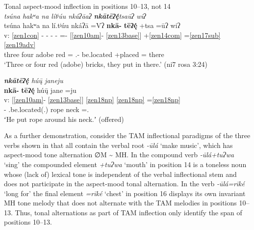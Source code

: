 \documentclass[output=paper]{langscibook}
\begin{document}
\ea\label{bkm:Ref83134430}Tonal aspect-mood inflection in positions 10{}--13, not 14 \\
            \ea \label{ex:key:27a} {
            {} \textit{tsúna hakʷa na lítʲúu nkáʔāaʔ \textbf{nkātēʔę́}tsaūʔ wiʔ} \\
            \glll {} tsúna hakʷa na lí.tʲúu nkáʔā =Vʔ \textbf{nkā-} \textbf{tēʔę́ } +tsa =ūʔ wiʔ \\
            v: \ref{zen1con} - - - - =- [\ref{zen10am}{}- \ref{zen13base}] +\ref{zen14com} =\ref{zen17sub} \ref{zen19adv} \\
             {} three four \Def{} adobe red =\Ana{} \Pfv.\Caus{}- be.located +placed =\Third\Pl{} there\\
            \glt `Three or four red (adobe) bricks, they put in there.' (ni7 rosa 3:24)
            }

            \ex \label{ex:key:27b}{ 
            \textit{\textbf{nkātēʔ\'{ę}} hú\={\k{u}} janeju} \\ 
            \glll {} \textbf{nkā-} \textbf{tēʔ\'{ę}} hú\={\k{u}} jane =ju\\
            v: [\ref{zen10am}{}- \ref{zen13base}] \ref{zen18np} \ref{zen18np} =\ref{zen18np} \\
            {} \Pfv{}- \Caus{}.be.located(.\Third{}) rope neck =\Third\Sg.\M{}\\
            \glt ʻHe put rope around his neck.ʼ (offered)
            } 
            \z 
\z 

As a further demonstration, consider the TAM inflectional paradigms of the three verbs shown in  that all contain the verbal root \textit{{}-ūlá} `make music', which has aspect-mood tone alternation ∅M {\textasciitilde} MH. In the compound verb \textit{{}-ūlá+tuɁwa} `sing' the compounded element \textit{+tuɁwa} `mouth' in position 14 is a toneless noun whose (lack of) lexical tone is independent of the verbal inflectional stem and does not participate in the aspect-mood tonal alternation. In the verb \textit{{}-ūlá=rīké} `long for' the final element \textit{=rīké} `chest' in position 16 displays its own invariant MH tone melody that does not alternate with the TAM melodies in positions 10{}--13. Thus, tonal alternations as part of TAM inflection only identify the span of positions 10{}--13.
\end{document}
